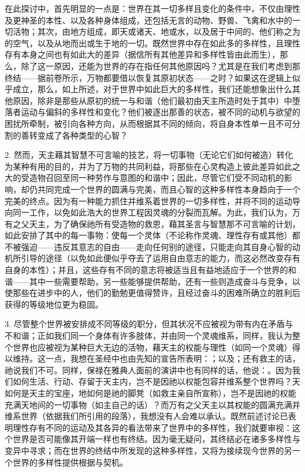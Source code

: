 在此探讨中，首先明显的一点是：世界在其一切多样且变化的条件中，不仅由理性及更神圣的本性、以及各种身体组成，还包括无言的动物、野兽、飞禽和水中的一切活物；其次，由地方组成，即天或诸天、地或水，以及居于中间的、他们称之为的空气，以及从地而出或生于地的一切。既然世界中存在如此多的多样性，且理性存有本身之间也有如此大的差异（据信所有其他差异和多样性皆由此而生），那么，除了这一原因，还能为世界的存在指任何其他原因吗？尤其是在我们考虑到那终结——据前卷所示，万物都要借以恢复其原初状态——之时？如果这在逻辑上似乎成立，那么，如上所述，对于世界中如此巨大的多样性，我们还能想象出什么其他原因，除非是那些从原初的统一与和谐（他们最初由天主所造时处于其中）中堕落者运动与偏斜的多样性和变化？他们被逐出那善的状态，被不同的动机与欲望的困扰所牵制，被引向各种方向，从而根据其不同的倾向，将自身本性单一且不可分割的善转变成了各种类型的心智？\par

2. 然而，天主藉其智慧不可言喻的技艺，将一切事物（无论它们如何被造）转化为某种有用的目的，并为了万物的共同利益，将那些在心灵构造上彼此差异如此之大的受造物召回至同一种劳作与意图的和谐中；因此，尽管它们受不同动机的影响，却仍共同完成一个世界的圆满与完美，而且心智的这种多样性本身趋向于一个完美的终点。因为有一种能力抓住并维系着世界的一切多样性，并将不同的运动导向同一工作，以免如此浩大的世界工程因灵魂的分裂而瓦解。为此，我们认为，万有之父天主，为了确保祂所有受造物的救恩，藉其圣言与智慧那不可言喻的计划，如此安排了其中的每一事物：使每一个灵体（不论称作灵魂、理性存有或其他）都不被强迫——违反其意志的自由——走向任何别的途径，只能走向其自身心智的动机所引导的途径（以免如此便似乎夺去了运用自由意志的能力，而这必然改变存有自身的本性）；并且，这些存有不同的意志将被适当且有益地适应于一个世界的和谐——其中一些需要帮助，另一些能够提供帮助，还有一些则造成奋斗与竞争，以使那些在进步中的人，他们的勤勉更值得赞许，且经过奋斗的困难所确立的胜利后获得的等级地位更为稳固。\par

3. 尽管整个世界被安排成不同等级的职分，但其状况不应被视为带有内在矛盾与不和谐；正如我们同一个身体有许多肢体，并由同一个灵魂维系，同样，我认为整个世界也应被视为某种巨大无边的活物，藉天主的权能与理性（如同一个灵魂）得以维持。这一点，我想在圣经中也由先知的宣告所表明：；以及；还有救主的话，祂说我们不可。同样，保禄在雅典人面前的演讲中也有同样的话，他说：。因为我们如何生活、行动、存留于天主内，岂不是因祂以权能包容并维系整个世界吗？天如何是天主的宝座，地如何是祂的脚凳（如救主亲自所宣称），岂不是因祂的权能充满天地间的一切事物（如主自己的话）？而万有之父天主以其权能的圆满充满并维系世界（依据我们所引用的段落），我想没有人会难以承认。既然前述讨论已表明理性存有不同的运动及其各异的看法带来了世界中的多样性，我们就要审视：这个世界是否可能像其开端一样也有终结。因为毫无疑问，其终结必在诸多多样性与变异中寻求；而在世界的终结中所发现的这种多样性，又将为接续现今世界的另一个世界的多样性提供根据与契机。\par

